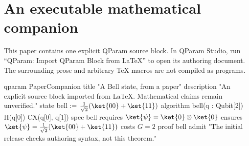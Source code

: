 \documentclass{article}
\begin{document}
\section*{An executable mathematical companion}
This paper contains one explicit QParam source block. In QParam Studio, run
``QParam: Import QParam Block from LaTeX'' to open its authoring document.
The surrounding prose and arbitrary TeX macros are not compiled as programs.

\begin{qparam}
qparam PaperCompanion
title "A Bell state, from a paper"
description "An explicit source block imported from LaTeX. Mathematical claims remain unverified."
state bell := $\frac{1}{\sqrt{2}}(\ket{00} + \ket{11})$
algorithm bell(q : Qubit[2]) {
  H(q[0])
  CX(q[0], q[1])
}
spec bell {
  requires $\ket{\psi} = \ket{0} \otimes \ket{0}$
  ensures $\ket{\psi} = \frac{1}{\sqrt{2}}(\ket{00} + \ket{11})$
  costs $G = 2$
}
proof bell {
  admit "The initial release checks authoring syntax, not this theorem."
}
\end{qparam}
\end{document}
